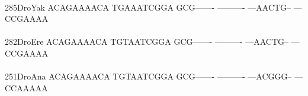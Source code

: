 \documentclass[11pt,twoside,reqno,a4paper]{article}
\begin{document}
{\hspace*{4\charwidth}\hspace*{7\charwidth}\hspace*{1\charwidth}\hspace*{1\charwidth}\hspace*{1\charwidth}\hspace*{1\charwidth}\hspace*{1\charwidth}\hspace*{1\charwidth}\\
285\hspace*{1\charwidth}DroYak	ACAGAAAACA	TGAAATCGGA	GCG-------	----------	---AACTG--	---CCGAAAA	\\
\hspace*{4\charwidth}\hspace*{7\charwidth}\hspace*{1\charwidth}\hspace*{1\charwidth}\hspace*{1\charwidth}\hspace*{1\charwidth}\hspace*{1\charwidth}\hspace*{1\charwidth}\\
282\hspace*{1\charwidth}DroEre	ACAGAAAACA	TGTAATCGGA	GCG-------	----------	---AACTG--	---CCGAAAA	\\
\hspace*{4\charwidth}\hspace*{7\charwidth}\hspace*{1\charwidth}\hspace*{1\charwidth}\hspace*{1\charwidth}\hspace*{1\charwidth}\hspace*{1\charwidth}\hspace*{1\charwidth}\\
251\hspace*{1\charwidth}DroAna	ACAGAAAACA	TGTAATCGGA	GCG-------	----------	---ACGGG--	---CCAAAAA	\\
\hspace*{4\charwidth}\hspace*{7\charwidth}\hspace*{1\charwidth}\hspace*{1\charwidth}\hspace*{1\charwidth}\hspace*{1\charwidth}\hspace*{1\charwidth}\hspace*{1\charwidth}\\
}
\end{document}
